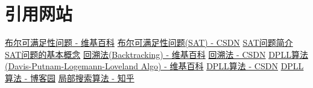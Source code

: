 \section{引用网站}
\noindent
\href{https://zh.wikipedia.org/wiki/%E5%B8%83%E5%B0%94%E5%8F%AF%E6%BB%A1%E8%B6%B3%E6%80%A7%E9%97%AE%E9%A2%98?oldformat=true}{布尔可满足性问题 - 维基百科}
\newline
\href{https://blog.csdn.net/qaqwqaqwq/article/details/125582233#Boolean_Satisfiability_Problem_SAT_4}{布尔可满足性问题(SAT) - CSDN}
\newline
\href{https://zhuanlan.zhihu.com/p/432853785#:~:text=%E5%8F%AF%E6%BB%A1%E8%B6%B3%E6%80%A7%E9%97%AE%E9%A2%98(Boo)}{SAT问题简介}
\newline
\href{https://zhuanlan.zhihu.com/p/206465770#:~:text=%E7%9B%AE%E5%89%8D%EF%BC%8CSAT%20%E9%97%AE%E9%A2%98%E7%9A%84}{SAT问题的基本概念}
\newline
\href{https://zh.wikipedia.org/wiki/%E5%9B%9E%E6%BA%AF%E6%B3%95}{回溯法(Backtracking) - 维基百科}
\newline
\href{URLhttps://blog.csdn.net/m0_52824954/article/details/123467217}{回溯法 - CSDN}
\newline
\href{https://zh.wikipedia.org/wiki/DPLL%E7%AE%97%E6%B3%95}{DPLL算法(Davis-Putnam-Logemann-Loveland Algo) - 维基百科}
\newline
\href{https://blog.csdn.net/weixin_42695737/article/details/123361318}{DPLL算法 - CSDN}
\newline
\href{https://www.cnblogs.com/chesium/p/15982285.html}{DPLL 算法 - 博客园}
\newline
\href{https://zhuanlan.zhihu.com/p/206710613#:~:text=%E5%BD%93%E5%B1%80%E9%83%A8%E6%90%9C%E7%B4%A2%E5%BA%94%E7%94%A8%E4%BA%8E%E6%B1%82%E8%A7%A3}{局部搜索算法 - 知乎}